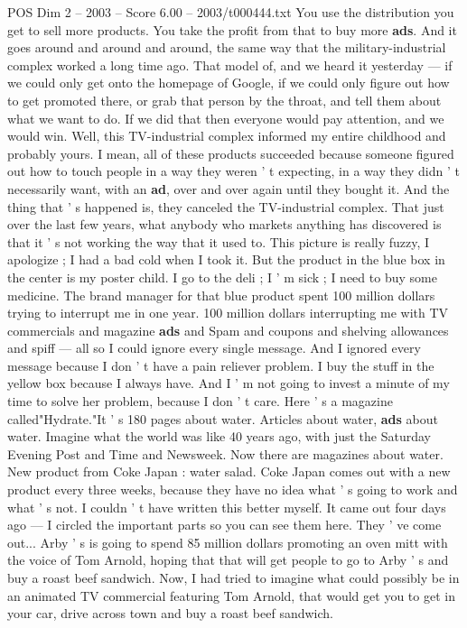 \begin{textsample}{POS Dim 2 – 2003 – Score 6.00 – 2003/t000444.txt}
You use the distribution you get to sell more products.
You take the profit from that to buy more \textbf{ads}.
And it goes around and around and around, the same way that the military-industrial complex worked a long time ago.
That model of, and we heard it yesterday — if we could only get onto the homepage of Google, if we could only figure out how to get promoted there, or grab that person by the throat, and tell them about what we want to do.
If we did that then everyone would pay attention, and we would win.
Well, this TV-industrial complex informed my entire childhood and probably yours.
I mean, all of these products succeeded because someone figured out how to touch people in a way they weren ' t expecting, in a way they didn ' t necessarily want, with an \textbf{ad}, over and over again until they bought it.
And the thing that ' s happened is, they canceled the TV-industrial complex.
That just over the last few years, what anybody who markets anything has discovered is that it ' s not working the way that it used to.
This picture is really fuzzy, I apologize ; I had a bad cold when I took it.
But the product in the blue box in the center is my poster child.
I go to the deli ; I ' m sick ; I need to buy some medicine.
The brand manager for that blue product spent 100 million dollars trying to interrupt me in one year. 100 million dollars interrupting me with TV commercials and magazine \textbf{ads} and Spam and coupons and shelving allowances and spiff — all so I could ignore every single message.
And I ignored every message because I don ' t have a pain reliever problem.
I buy the stuff in the yellow box because I always have.
And I ' m not going to invest a minute of my time to solve her problem, because I don ' t care.
Here ' s a magazine called"Hydrate."It ' s 180 pages about water.
Articles about water, \textbf{ads} about water.
Imagine what the world was like 40 years ago, with just the Saturday Evening Post and Time and Newsweek.
Now there are magazines about water.
New product from Coke Japan : water salad.
Coke Japan comes out with a new product every three weeks, because they have no idea what ' s going to work and what ' s not.
I couldn ' t have written this better myself.
It came out four days ago — I circled the important parts so you can see them here.
They ' ve come out...
Arby ' s is going to spend 85 million dollars promoting an oven mitt with the voice of Tom Arnold, hoping that that will get people to go to Arby ' s and buy a roast beef sandwich.
Now, I had tried to imagine what could possibly be in an animated TV commercial featuring Tom Arnold, that would get you to get in your car, drive across town and buy a roast beef sandwich.

\end{textsample}
